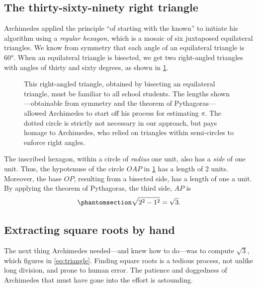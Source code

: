 \documentclass[
  a4paper,
]{article}
\begin{document}
\subsection{The thirty-sixty-ninety right
triangle}\label{the-thirty-sixty-ninety-right-triangle}

Archimedes applied the principle ``of starting with the known'' to
initiate his algorithm using a \emph{regular hexagon}, which is a mosaic
of six juxtaposed equilateral triangles. We know from symmetry that each
angle of an equilateral triangle is \(60°\). When an equilateral
triangle is bisected, we get two right-angled triangles with angles of
thirty and sixty degrees, as shown in \cref{fig:thirty-sixty}.

\begin{figure}
\centering

\caption{This right-angled triangle, obtained by bisecting an
equilateral triangle, must be familiar to all school students. The
lengths shown---obtainable from symmetry and the theorem of
Pythagoras---allowed Archimedes to start off his process for estimating
\(\pi\). The dotted circle is strictly not necessary in our approach,
but pays homage to Archimedes, who relied on triangles within
semi-circles to enforce right angles.}\label{fig:thirty-sixty}
\end{figure}

The inscribed hexagon, within a circle of \emph{radius} one unit, also
has a \emph{side} of one unit. Thus, the hypotenuse of the circle
\(OAP\) in \cref{fig:thirty-sixty} has a length of 2 units. Moreover,
the base \(OP\), resulting from a bisected side, has a length of one a
unit. By applying the theorem of Pythagoras, the third side, \(AP\) is
\begin{equation}\phantomsection\label{eq:triangle}{
\sqrt{2^2 - 1^2} = \sqrt{3}.
}\end{equation}

\subsection{Extracting square roots by
hand}\label{extracting-square-roots-by-hand}

The next thing Archimedes needed---and knew how to do---was to compute
\(\sqrt{3}\), which figures in \cref{eq:triangle}. Finding square roots
is a tedious process, not unlike long division, and prone to human
error. The patience and doggedness of Archimedes that must have gone
into the effort is astounding.
\end{document}
